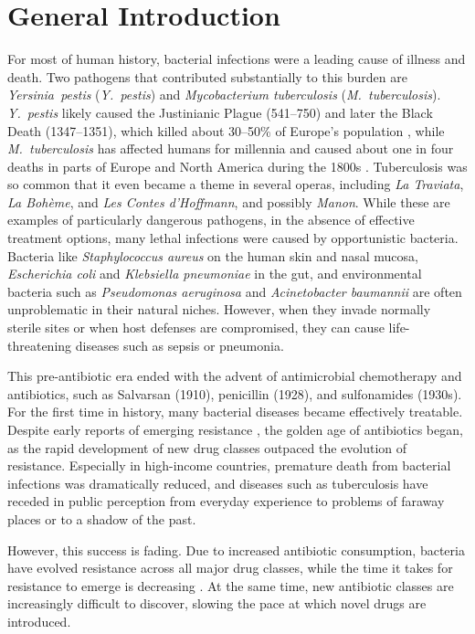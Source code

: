 \documentclass[../main.tex]{subfiles}
\begin{document}
\chapter{General Introduction}
For most of human history, bacterial infections were a leading cause of illness and death.
Two pathogens that contributed substantially to this burden are \textit{Yersinia~pestis} (\textit{Y.~pestis}) and \textit{Mycobacterium tuberculosis} (\textit{M.~tuberculosis}).
\textit{Y.~pestis} likely caused the Justinianic Plague (541--750) \cite{Harbeck2013} and later the Black Death (1347--1351), which killed about 30--50\% of Europe’s population \cite{Barbieri2021}, while \textit{M.~tuberculosis} has affected humans for millennia and caused about one in four deaths in parts of Europe and North America during the 1800s \cite{Daniel1994}.
Tuberculosis was so common that it even became a theme in several operas, including \textit{La Traviata}, \textit{La Boh\`eme}, and \textit{Les Contes d’Hoffmann}, and possibly \textit{Manon}.
While these are examples of particularly dangerous pathogens, in the absence of effective treatment options, many lethal infections were caused by opportunistic bacteria.
Bacteria like \textit{Staphylococcus aureus} on the human skin and nasal mucosa, \textit{Escherichia coli} and \textit{Klebsiella pneumoniae} in the gut, and environmental bacteria such as \textit{Pseudomonas aeruginosa} and \textit{Acinetobacter baumannii} are often unproblematic in their natural niches.
However, when they invade normally sterile sites or when host defenses are compromised, they can cause life-threatening diseases such as sepsis or pneumonia.

This pre-antibiotic era ended with the advent of antimicrobial chemotherapy and antibiotics, such as Salvarsan (1910), penicillin (1928), and sulfonamides (1930s).
For the first time in history, many bacterial diseases became effectively treatable.
Despite early reports of emerging resistance \cite{Kirby1944}, the golden age of antibiotics began, as the rapid development of new drug classes outpaced the evolution of resistance.
Especially in high-income countries, premature death from bacterial infections was dramatically reduced, and diseases such as  tuberculosis have receded in public perception from everyday experience to problems of faraway places or to a shadow of the past.

However, this success is fading.
Due to increased antibiotic consumption, bacteria have evolved resistance across all major drug classes, while the time it takes for resistance to emerge is decreasing \cite{Witzany2020}.
At the same time, new antibiotic classes are increasingly difficult to discover, slowing the pace at which  novel drugs are introduced.
\end{document}
